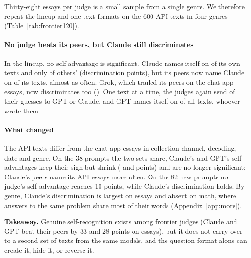 Thirty-eight essays per judge is a small sample from a single genre. We
therefore repeat the lineup and one-text formats on the 600 API texts in four
genres (Table~\ref{tab:frontier120}).

\paragraph{No judge beats its peers, but Claude still discriminates} In the
lineup, no self-advantage is significant. Claude names itself on
\FXClaudeLineupSelf{} of its own texts and only \FXClaudeLineupFA{} of others'
(discrimination \FXClaudeLineupDisc{} points), but its peers now name Claude on
\FXClaudeLineupPeer{} of its texts, almost as often. Grok, which trailed its
peers on the chat-app essays, now discriminates too (\FXGrokLineupDisc{}). One
text at a time, the judges again send \FXSingleTopTwo{} of their guesses to GPT
or Claude, and GPT names itself on \FXGPTSingleNamesSelf{} of all texts,
whoever wrote them.

\paragraph{What changed} The API texts differ from the chat-app essays in
collection channel, decoding, date and genre. On the 38 prompts the two sets
share, Claude's and GPT's self-advantages keep their sign but shrink
(\FXOldClaudeLineupAdv{} and \FXOldGPTLineupAdv{} points) and are no longer
significant; Claude's peers name its API essays more often. On the 82 new
prompts no judge's self-advantage reaches 10 points, while Claude's
discrimination holds. By genre, Claude's discrimination is largest on essays
and absent on math, where answers to the same problem share most of their
words (Appendix~\ref{app:more}).

\begin{takeaway}
\textbf{Takeaway.} Genuine self-recognition exists among frontier judges
(Claude and GPT beat their peers by 33 and 28 points on essays), but it does
not carry over to a second set of texts from the same models, and the question
format alone can create it, hide it, or reverse it.
\end{takeaway}
